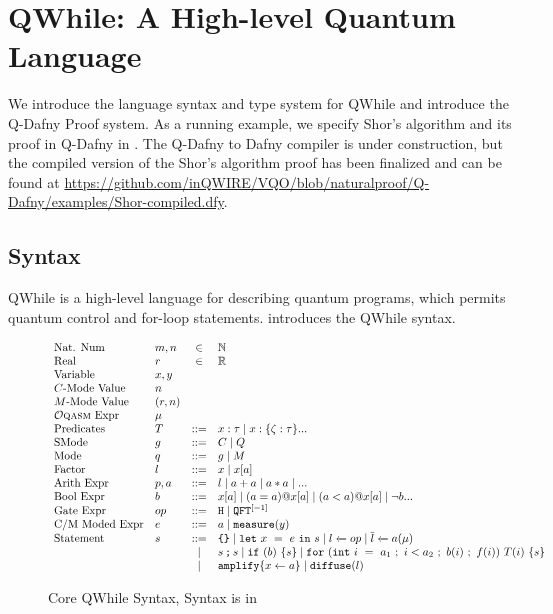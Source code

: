 \section{QWhile: A High-level Quantum Language}
\label{sec:vqir}

We introduce the language syntax and type system for QWhile and introduce the Q-Dafny Proof system.
As a running example, we specify Shor's algorithm and its proof in Q-Dafny in .
The Q-Dafny to Dafny compiler is under construction, but the compiled version of the Shor's algorithm proof has been finalized
and can be found at \url{https://github.com/inQWIRE/VQO/blob/naturalproof/Q-Dafny/examples/Shor-compiled.dfy}.



\subsection{Syntax}
\sloppy
QWhile is a high-level language for describing quantum programs,
which permits quantum control and for-loop statements.
 introduces the QWhile syntax. 

\begin{figure}[t]
  \small
  \[\begin{array}{llcl} 
      \text{Nat. Num} & m, n & \in & \mathbb{N}       \\
      \text{Real} & r & \in & \mathbb{R}\\
      \text{Variable} & x,y \\
      \text{$C$-Mode Value} & n\\
      \text{$M$-Mode Value} & (r,n)\\
      \text{\oqasm Expr} & \mu\\
      \text{Predicates} & T & ::= & x:\tau  \mid x:\{\zeta:\tau\} ...\\
      \text{SMode} & g & ::= & C  \mid Q\\
      \text{Mode} & q & ::= & g  \mid M\\
      \text{Factor} & l & ::= & x \mid x[a] \\
      \text{Arith Expr} & p,a & ::= & l \mid a + a \mid a * a \mid ... \\
      \text{Bool Expr} & b & ::= & x[a] \mid (a = a) @ x[a] \mid (a < a) @ x[a] \mid \neg b  ... \\
      \text{Gate Expr} & op & ::= & \texttt{H} \mid \iqft[\lbrack -1 \rbrack]{}{} \\
      \text{C/M Moded Expr}& e & ::= & a \mid \smea{y}  \\
      \text{Statement} & s & ::= & \sskip \mid \sexp{x}{e}{s} \mid  \ssassign{l}{}{op} \mid \ssassign{\overline{l}}{}{a(\mu)} 
                                 \\ & & \mid & \sseq{s}{s} \mid \sifq{b}{s} \mid
                                     \sqwhile{\sinit{i}{a_1}}{i<a_2}{b(i)}{f(i)}{T(i)}{s}
                     \\&&\mid & \samplify{\ssassign{x}{}{a}}
                      \mid \sdistr{l}
    \end{array}
  \]
  \caption{Core QWhile Syntax, \oqasm Syntax is in }
  \label{fig:vqimp}
\end{figure}

